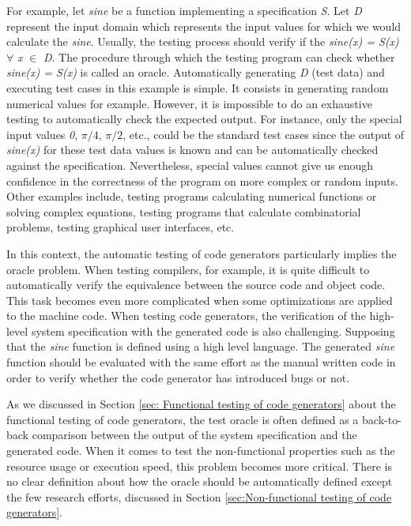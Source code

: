 For example, let \textit{sine} be a function implementing a specification \textit{S}. Let \textit{D} represent the input domain which represents the input values for which we would calculate the \textit{sine}. Usually, the testing process should verify if the \textit{sine(x) = S(x)} $\forall$ \textit{x} $\in$ \textit{D}. The procedure through which the testing program can check whether \textit{sine(x) = S(x)} is called an oracle.
Automatically generating  \textit{D} (test data) and executing test cases in this example is simple. It consists in generating random numerical values for example. However, it is impossible to do an exhaustive testing to automatically check the expected output.
For instance, only the special input values  \textit{0}, $\pi/4$,  $\pi/2$, etc., could be the standard test cases since the output of  \textit{sine(x)} for these test data values is known and can be automatically checked against the specification. Nevertheless, special values cannot give us enough confidence in the correctness of the program on more complex or random inputs. 
Other examples include, testing programs calculating numerical functions or solving complex equations, testing programs that calculate combinatorial problems, testing graphical user interfaces, etc.

In this context, the automatic testing of code generators particularly implies the oracle problem. When testing compilers, for example, it is quite difficult to automatically verify the equivalence between the source code and object code. This task becomes even more complicated when some optimizations are applied to the machine code. 
When testing code generators, the verification of the high-level system specification with the generated code is also challenging. Supposing that the \textit{sine} function is defined using a high level language. The generated \textit{sine} function should be evaluated with the same effort as the manual written code in order to verify whether the code generator has introduced bugs or not. 

As we discussed in Section \ref{sec: Functional testing of code generators} about the functional testing of code generators, the test oracle is often defined as a back-to-back comparison between the output of the system specification and the generated code.
When it comes to test the non-functional properties such as the resource usage or execution speed, this problem becomes more critical. There is no clear definition about how the oracle should be automatically defined except the few research efforts, discussed in Section \ref{sec:Non-functional testing of code generators}. 


